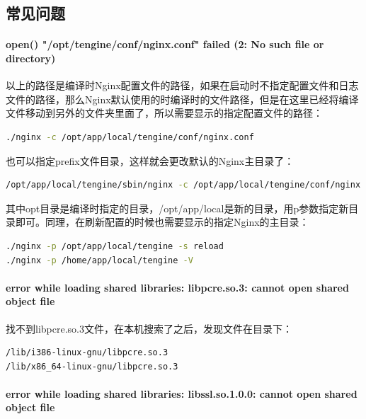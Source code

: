 \documentclass[letter]{book}
\begin{document}
\subsection{常见问题}

\paragraph{open() "/opt/tengine/conf/nginx.conf" failed (2: No such file or directory)}

以上的路径是编译时Nginx配置文件的路径，如果在启动时不指定配置文件和日志文件的路径，那么Nginx默认使用的时编译时的文件路径，但是在这里已经将编译文件移动到另外的文件夹里面了，所以需要显示的指定配置文件的路径：

\begin{lstlisting}[language=bash]
./nginx -c /opt/app/local/tengine/conf/nginx.conf
\end{lstlisting}

也可以指定prefix文件目录，这样就会更改默认的Nginx主目录了：

\begin{lstlisting}[language=bash]
/opt/app/local/tengine/sbin/nginx -c /opt/app/local/tengine/conf/nginx.conf -p /opt/app/local/tengine
\end{lstlisting}

其中opt目录是编译时指定的目录，/opt/app/local是新的目录，用p参数指定新目录即可。同理，在刷新配置的时候也需要显示的指定Nginx的主目录：

\begin{lstlisting}[language=bash]
./nginx -p /opt/app/local/tengine -s reload
./nginx -p /home/app/local/tengine -V
\end{lstlisting}

\paragraph{error while loading shared libraries: libpcre.so.3: cannot open shared object file}

找不到libpcre.so.3文件，在本机搜索了之后，发现文件在目录下：

\begin{lstlisting}[language=bash]
/lib/i386-linux-gnu/libpcre.so.3
/lib/x86_64-linux-gnu/libpcre.so.3
\end{lstlisting}

\paragraph{error while loading shared libraries: libssl.so.1.0.0: cannot open shared object file}
\end{document}
